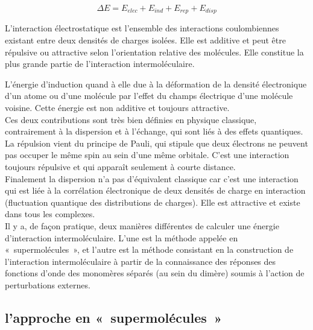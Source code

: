 \begin{equation}
\Delta E = E_{elec} + E_{ind} + E_{rep} + E_{disp}
\end{equation} 

L’interaction électrostatique est l’ensemble des interactions coulombiennes existant entre deux densités de charges isolées. Elle est additive et peut être répulsive ou attractive selon l’orientation relative des molécules. Elle constitue la plus grande partie de l’interaction intermoléculaire. 
 
L’énergie d’induction quand à elle due à la déformation de la densité électronique d’un atome ou d’une molécule par l’effet du champs électrique d’une molécule voisine. Cette énergie est non additive et toujours attractive.\\

Ces deux contributions sont très bien définies en physique classique, contrairement à la dispersion et à l’échange, qui sont liés à des effets quantiques.\\

La répulsion vient du principe de Pauli, qui stipule que deux électrons ne peuvent pas occuper le même spin au sein d’une même orbitale. C’est une interaction toujours répulsive et qui apparaît seulement à courte distance.\\

Finalement la dispersion n’a pas d’équivalent classique car c’est une interaction qui est liée à la corrélation électronique de deux densités de charge en interaction (fluctuation quantique des distributions de charges). Elle est attractive et existe dans tous les complexes.\\

Il y a, de façon pratique, deux manières différentes de calculer une énergie d’interaction intermoléculaire. L’une est la méthode appelée en « supermolécules », et l’autre est la méthode consistant en la construction de l’interaction intermoléculaire à partir de la connaissance des réponses des fonctions d’onde des monomères séparés (au sein du dimère) soumis à l’action de perturbations externes.\\


\subsection{l’approche en « supermolécules »}

